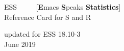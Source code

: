 \documentclass[a4paper]{article}
\begin{document}
\begin{center}
  {\LARGE ESS \ \ \ \ {\large
      [\textbf{E}macs \textbf{S}peaks \textbf{Statistics}]}
      \\[.5ex] Reference Card for S and R}

  \smallskip

  {\small updated for ESS 18.10-3}%
  \\[1ex] {\tiny June 2019}
\end{center}
\end{document}
